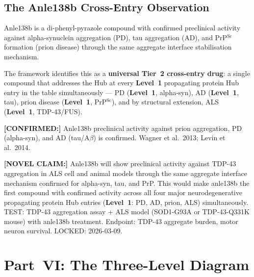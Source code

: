 \documentclass[12pt,a4paper]{article}
\newcommand{\novel}[1]{\noindent\colorbox{yellow!18}{\parbox{\dimexpr\linewidth-2\fboxsep}{%
  \textbf{[NOVEL CLAIM:]} #1}}\vspace{0.4em}}
\newcommand{\confirmed}[1]{\noindent\colorbox{green!10}{\parbox{\dimexpr\linewidth-2\fboxsep}{%
  \textbf{[CONFIRMED:]} #1}}\vspace{0.4em}}
\newcommand{\Lev}[1]{\textbf{Level~#1}}
\begin{document}
\subsection{The Anle138b Cross-Entry Observation}

Anle138b is a di-phenyl-pyrazole compound with confirmed preclinical activity
against alpha-synuclein aggregation (PD), tau aggregation (AD), and PrP$^{\mathrm{Sc}}$
formation (prion disease) through the same aggregate interface stabilisation
mechanism.

The framework identifies this as a \textbf{universal Tier~2 cross-entry drug}:
a single compound that addresses the Hub at every \Lev{1} propagating protein
Hub entry in the table simultaneously --- PD (\Lev{1}, alpha-syn), AD
(\Lev{1}, tau), prion disease (\Lev{1}, PrP$^{\mathrm{Sc}}$), and by
structural extension, ALS (\Lev{1}, TDP-43/FUS).

\confirmed{Anle138b preclinical activity against prion aggregation, PD
(alpha-syn), and AD (tau/A$\beta$) is confirmed. Wagner et al.\ 2013;
Levin et al.\ 2014.}

\novel{Anle138b will show preclinical activity against TDP-43 aggregation
in ALS cell and animal models through the same aggregate interface mechanism
confirmed for alpha-syn, tau, and PrP. This would make anle138b the first
compound with confirmed activity across all four major neurodegenerative
propagating protein Hub entries (\Lev{1}: PD, AD, prion, ALS) simultaneously.
TEST: TDP-43 aggregation assay + ALS model (SOD1-G93A or TDP-43-Q331K mouse)
with anle138b treatment. Endpoint: TDP-43 aggregate burden, motor neuron
survival. LOCKED: 2026-03-09.}

\section{Part~VI: The Three-Level Diagram}
\end{document}
